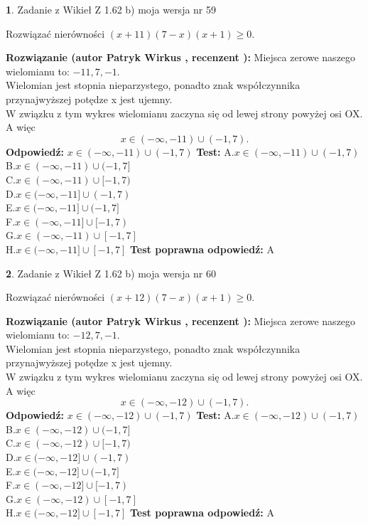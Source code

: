 \documentclass[12pt, a4paper]{article}
\theoremstyle{definition} %
\newtheorem{zad}{}
\newcommand{\zadStart}[1]{\begin{zad}#1\newline}
\newcommand{\zadStop}{\end{zad}}
\newcommand{\rozwStart}[2]{\noindent \textbf{Rozwiązanie (autor #1 , recenzent #2): }\newline}
\newcommand{\rozwStop}{\newline}
\newcommand{\odpStart}{\noindent \textbf{Odpowiedź:}\newline}
\newcommand{\odpStop}{\newline}
\newcommand{\testStart}{\noindent \textbf{Test:}\newline}
\newcommand{\testStop}{\newline}
\newcommand{\kluczStart}{\noindent \textbf{Test poprawna odpowiedź:}\newline}
\newcommand{\kluczStop}{\newline}
\begin{document}
\zadStart{Zadanie z Wikieł Z 1.62 b) moja wersja nr 59}

Rozwiązać nierówności $(x+11)(7-x)(x+1)\ge0$.
\zadStop
\rozwStart{Patryk Wirkus}{}
Miejsca zerowe naszego wielomianu to: $-11, 7, -1$.\\
Wielomian jest stopnia nieparzystego, ponadto znak współczynnika przy\linebreak najwyższej potędze x jest ujemny.\\ W związku z tym wykres wielomianu zaczyna się od lewej strony powyżej osi OX. A więc $$x \in (-\infty,-11) \cup (-1,7).$$
\rozwStop
\odpStart
$x \in (-\infty,-11) \cup (-1,7)$
\odpStop
\testStart
A.$x \in (-\infty,-11) \cup (-1,7)$\\
B.$x \in (-\infty,-11) \cup (-1,7]$\\
C.$x \in (-\infty,-11) \cup [-1,7)$\\
D.$x \in (-\infty,-11] \cup (-1,7)$\\
E.$x \in (-\infty,-11] \cup (-1,7]$\\
F.$x \in (-\infty,-11] \cup [-1,7)$\\
G.$x \in (-\infty,-11) \cup [-1,7]$\\
H.$x \in (-\infty,-11] \cup [-1,7]$
\testStop
\kluczStart
A
\kluczStop



\zadStart{Zadanie z Wikieł Z 1.62 b) moja wersja nr 60}

Rozwiązać nierówności $(x+12)(7-x)(x+1)\ge0$.
\zadStop
\rozwStart{Patryk Wirkus}{}
Miejsca zerowe naszego wielomianu to: $-12, 7, -1$.\\
Wielomian jest stopnia nieparzystego, ponadto znak współczynnika przy\linebreak najwyższej potędze x jest ujemny.\\ W związku z tym wykres wielomianu zaczyna się od lewej strony powyżej osi OX. A więc $$x \in (-\infty,-12) \cup (-1,7).$$
\rozwStop
\odpStart
$x \in (-\infty,-12) \cup (-1,7)$
\odpStop
\testStart
A.$x \in (-\infty,-12) \cup (-1,7)$\\
B.$x \in (-\infty,-12) \cup (-1,7]$\\
C.$x \in (-\infty,-12) \cup [-1,7)$\\
D.$x \in (-\infty,-12] \cup (-1,7)$\\
E.$x \in (-\infty,-12] \cup (-1,7]$\\
F.$x \in (-\infty,-12] \cup [-1,7)$\\
G.$x \in (-\infty,-12) \cup [-1,7]$\\
H.$x \in (-\infty,-12] \cup [-1,7]$
\testStop
\kluczStart
A
\kluczStop
\end{document}
